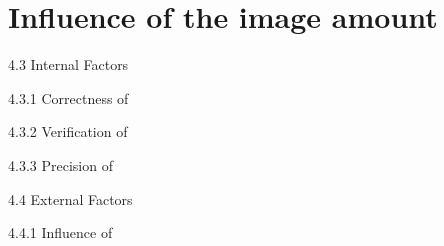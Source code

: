\section{Influence of the image amount}

4.3 Internal Factors

4.3.1 Correctness of

4.3.2 Verification of

4.3.3 Precision of


4.4 External Factors

4.4.1 Influence of 

\blinddocument
